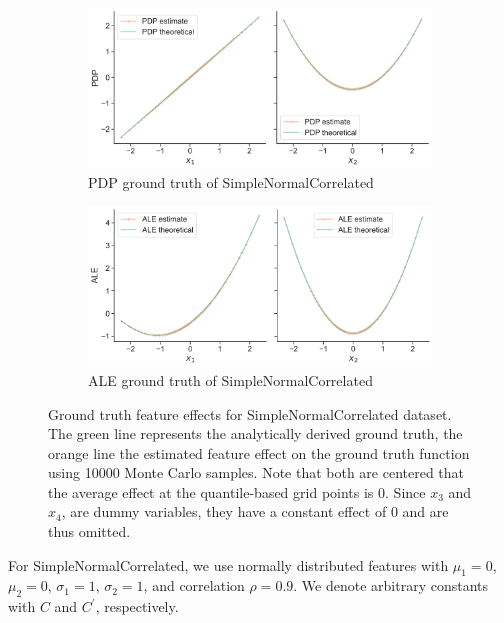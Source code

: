 \documentclass[runningheads]{llncs}
\begin{document}
\begin{figure}[h!]
    \begin{subfigure}[b]{0.49\textwidth}
        \centering
        \includegraphics[width=\textwidth]{img/SNC-all/pdp_groundtruth_comparison.png}
        \caption{PDP ground truth of SimpleNormalCorrelated}
    \end{subfigure}
    \begin{subfigure}[b]{0.49\textwidth}
        \centering
        \includegraphics[width=\textwidth]{img/SNC-all/ale_groundtruth_comparison.png}
        \caption{ALE ground truth of SimpleNormalCorrelated}
    \end{subfigure}
    \caption{Ground truth feature effects for SimpleNormalCorrelated dataset. The green line
    represents the analytically derived ground truth, the orange line the estimated feature
    effect on the ground truth function using 10000 Monte Carlo samples. Note that both
    are centered that the average effect at the quantile-based grid points is 0.
    Since $x_3$ and $x_4$, are dummy variables, they have a constant effect of 0 and are
    thus omitted.}
    \label{fig:snc-groundtruth}  %
\end{figure}

\noindent For SimpleNormalCorrelated, we use normally distributed features with $\mu_1 = 0$,
$\mu_2 = 0$, $\sigma_1 = 1$, $\sigma_2 = 1$, and correlation
$\rho = 0.9$. We denote
arbitrary constants with $C$ and $C^\prime$, respectively.
\end{document}
